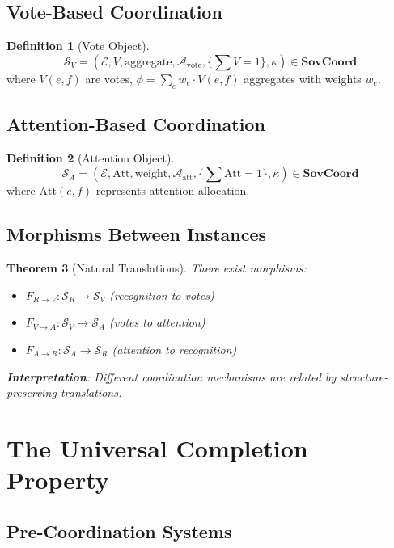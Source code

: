 \documentclass[11pt,a4paper]{article}
\newtheorem{theorem}{Theorem}[section]
\theoremstyle{definition}
\newtheorem{definition}[theorem]{Definition}
\theoremstyle{remark}
\newcommand{\E}{\mathcal{E}}
\newcommand{\A}{\mathcal{A}}
\newcommand{\SovCoord}{\mathbf{SovCoord}}
\begin{document}
\subsection{Vote-Based Coordination}

\begin{definition}[Vote Object]
\[ \mathcal{S}_V = (\E, V, \text{aggregate}, \A_{\text{vote}}, \{\sum V = 1\}, \kappa) \in \SovCoord \]
where $V(e,f)$ are votes, $\phi = \sum_e w_e \cdot V(e,f)$ aggregates with weights $w_e$.
\end{definition}

\subsection{Attention-Based Coordination}

\begin{definition}[Attention Object]
\[ \mathcal{S}_A = (\E, \text{Att}, \text{weight}, \A_{\text{att}}, \{\sum \text{Att} = 1\}, \kappa) \in \SovCoord \]
where $\text{Att}(e,f)$ represents attention allocation.
\end{definition}

\subsection{Morphisms Between Instances}

\begin{theorem}[Natural Translations]
There exist morphisms:
\begin{itemize}
\item $F_{R \to V}: \mathcal{S}_R \to \mathcal{S}_V$ (recognition to votes)
\item $F_{V \to A}: \mathcal{S}_V \to \mathcal{S}_A$ (votes to attention)
\item $F_{A \to R}: \mathcal{S}_A \to \mathcal{S}_R$ (attention to recognition)
\end{itemize}

\textbf{Interpretation}: Different coordination mechanisms are related by structure-preserving translations.
\end{theorem}

\section{The Universal Completion Property}

\subsection{Pre-Coordination Systems}
\end{document}
